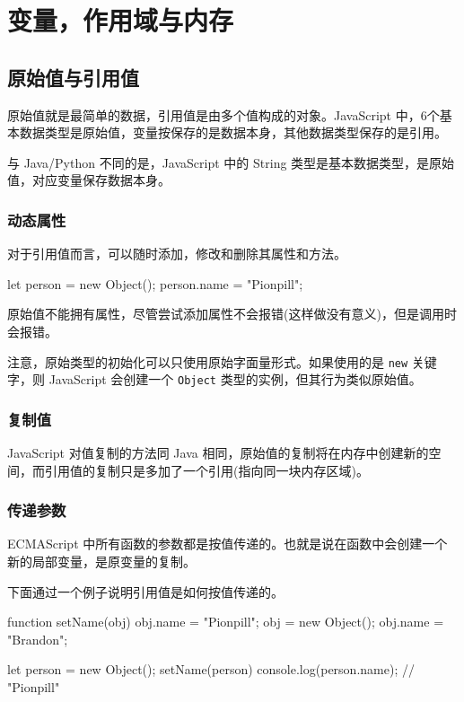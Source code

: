 \section{变量，作用域与内存}
\subsection{原始值与引用值}

原始值就是最简单的数据，引用值是由多个值构成的对象。JavaScript 中，6个基本数据类型是原始值，变量按保存的是数据本身，其他数据类型保存的是引用。

与 Java/Python 不同的是，JavaScript 中的 String 类型是基本数据类型，是原始值，对应变量保存数据本身。

\subsubsection*{动态属性}

对于引用值而言，可以随时添加，修改和删除其属性和方法。

\begin{JavaScript}
let person = new Object();
person.name = "Pionpill";
\end{JavaScript}

原始值不能拥有属性，尽管尝试添加属性不会报错(这样做没有意义)，但是调用时会报错。

注意，原始类型的初始化可以只使用原始字面量形式。如果使用的是 \texttt{new} 关键字，则 JavaScript 会创建一个 \texttt{Object} 类型的实例，但其行为类似原始值。

\subsubsection*{复制值}

JavaScript 对值复制的方法同 Java 相同，原始值的复制将在内存中创建新的空间，而引用值的复制只是多加了一个引用(指向同一块内存区域)。

\subsubsection*{传递参数}

ECMAScript 中所有函数的参数都是按值传递的。也就是说在函数中会创建一个新的局部变量，是原变量的复制。

下面通过一个例子说明引用值是如何按值传递的。

\begin{JavaScript}
function setName(obj) {
    obj.name = "Pionpill";
    obj = new Object();
    obj.name = "Brandon";
}

let person = new Object();
setName(person)
console.log(person.name);   // "Pionpill"
\end{JavaScript}

